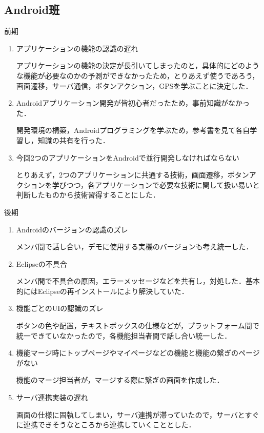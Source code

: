 \subsection{Android班}
前期
\begin{enumerate}
\item アプリケーションの機能の認識の遅れ
\par
アプリケーションの機能の決定が長引いてしまったのと，具体的にどのような機能が必要なのかの予測ができなかったため，とりあえず使うであろう，画面遷移，サーバ通信，ボタンアクション，GPSを学ぶことに決定した．
\item Androidアプリケーション開発が皆初心者だったため，事前知識がなかった．
\par
開発環境の構築，Androidプログラミングを学ぶため，参考書を見て各自学習し，知識の共有を行った．
\item 今回2つのアプリケーションをAndroidで並行開発しなければならない
\par
とりあえず，2つのアプリケーションに共通する技術，画面遷移，ボタンアクションを学びつつ，各アプリケーションで必要な技術に関して扱い易いと判断したものから技術習得することにした．
\end{enumerate}
\par 後期
\begin{enumerate}
\item Androidのバージョンの認識のズレ
\par
メンバ間で話し合い，デモに使用する実機のバージョンも考え統一した．
\item Eclipseの不具合
\par
メンバ間で不具合の原因，エラーメッセージなどを共有し，対処した．基本的にはEclipseの再インストールにより解決していた．
\item 機能ごとのUIの認識のズレ
\par
ボタンの色や配置，テキストボックスの仕様などが，プラットフォーム間で統一できていなかったので，各機能担当者間で話し合い統一した．
\item 機能マージ時にトップページやマイページなどの機能と機能の繋ぎのページがない
\par
機能のマージ担当者が，マージする際に繋ぎの画面を作成した．
\item サーバ連携実装の遅れ
\par
画面の仕様に固執してしまい，サーバ連携が滞っていたので，サーバとすぐに連携できそうなところから連携していくこととした．
\end{enumerate}
